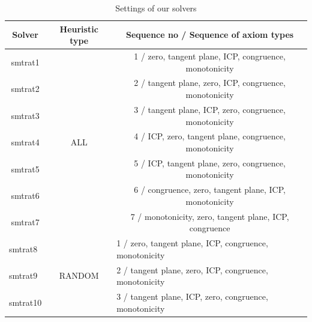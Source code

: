 \begin{table}[]
    \centering
    \caption{Settings of our solvers}
    \begin{tabular}{|c|c|c|}
    \hline
    \textbf{Solver}                & \textbf{Heuristic type}                           & \textbf{Sequence no / Sequence of axiom types}                                                       \\ \hline
    smtrat1                        & \multirow{7}{*}{ALL}                         & 1 / zero, tangent plane, ICP, congruence, monotonicity                      \\ \cline{1-1} \cline{3-3} 
    smtrat2                        &                                              & 2 / tangent plane, zero, ICP, congruence, monotonicity                      \\ \cline{1-1} \cline{3-3} 
    smtrat3                        &                                              & 3 / tangent plane, ICP, zero, congruence, monotonicity                      \\ \cline{1-1} \cline{3-3} 
    smtrat4                        &                                              & 4 / ICP, zero, tangent plane, congruence, monotonicity                      \\ \cline{1-1} \cline{3-3} 
    smtrat5                        &                                              & 5 / ICP, tangent plane, zero, congruence, monotonicity                      \\ \cline{1-1} \cline{3-3} 
    smtrat6                        &                                              & 6 / congruence, zero, tangent plane, ICP, monotonicity                      \\ \cline{1-1} \cline{3-3} 
    smtrat7                        &                                              & 7 / monotonicity, zero, tangent plane, ICP, congruence                      \\ \hline
    \multicolumn{1}{|l|}{smtrat8}  & \multicolumn{1}{c|}{\multirow{7}{*}{RANDOM}} & \multicolumn{1}{l|}{1 / zero, tangent plane, ICP, congruence, monotonicity} \\ \cline{1-1} \cline{3-3} 
    \multicolumn{1}{|l|}{smtrat9}  & \multicolumn{1}{l|}{}                        & \multicolumn{1}{l|}{ 2 / tangent plane, zero, ICP, congruence, monotonicity} \\ \cline{1-1} \cline{3-3} 
    \multicolumn{1}{|l|}{smtrat10} & \multicolumn{1}{l|}{}                        & \multicolumn{1}{l|}{3 / tangent plane, ICP, zero, congruence, monotonicity} \\ \cline{1-1} \cline{3-3} 

\end{tabular}
\end{table}

